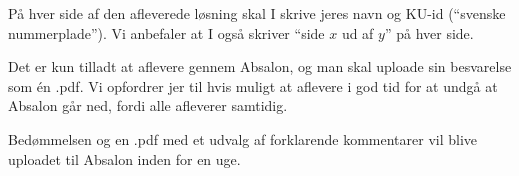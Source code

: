 \documentclass{article}
\begin{document}
	\bigskip 
	\noindent
	P\aa{} hver side af den afleverede l\o{}sning skal I skrive jeres navn og KU-id (``svenske nummerplade''). Vi anbefaler at I ogs\aa{} skriver ``side $x$ ud af $y$'' p\aa{} hver side.
	
	\bigskip 
	\noindent
	Det er kun tilladt at aflevere gennem Absalon, og man skal uploade sin besvarelse som én .pdf. Vi opfordrer jer til hvis muligt at aflevere i god tid for at undgå at Absalon går ned, fordi alle afleverer samtidig.
	
	\bigskip
	\noindent
	Bedømmelsen og en .pdf med et udvalg af forklarende kommentarer vil blive uploadet til Absalon inden for en uge.
\end{document}
